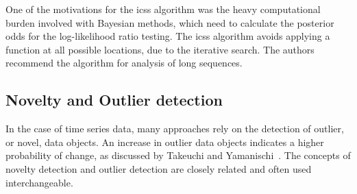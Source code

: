 One of the motivations for the \gls{icss} algorithm was the heavy computational burden involved with Bayesian methods, which need to calculate the posterior odds for the log-likelihood ratio testing.
The \gls{icss} algorithm avoids applying a function at all possible locations, due to the iterative search.
The authors recommend the algorithm for analysis of long sequences.






\subsection{Novelty and Outlier detection}\label{subsec:novelty_and_outlier_detection}
In the case of time series data, many approaches rely on the detection of outlier, or novel, data objects.
An increase in outlier data objects indicates a higher probability of change, as discussed by Takeuchi and Yamanischi~\cite{takeuchi2006unifying}.
The concepts of novelty detection and outlier detection are closely related and often used interchangeable.

